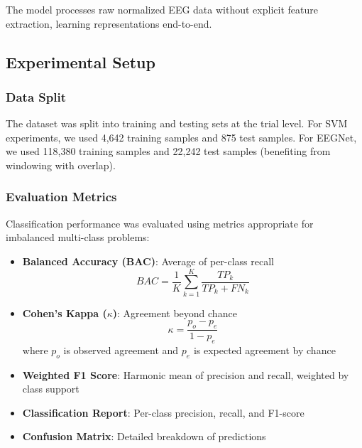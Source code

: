 \documentclass[conference]{IEEEtran}
\begin{document}
The model processes raw normalized EEG data without explicit feature extraction, learning representations end-to-end.

\subsection{Experimental Setup}

\subsubsection{Data Split}
The dataset was split into training and testing sets at the trial level. For SVM experiments, we used 4,642 training samples and 875 test samples. For EEGNet, we used 118,380 training samples and 22,242 test samples (benefiting from windowing with overlap).

\subsubsection{Evaluation Metrics}
Classification performance was evaluated using metrics appropriate for imbalanced multi-class problems:

\begin{itemize}
    \item \textbf{Balanced Accuracy (BAC)}: Average of per-class recall
    \begin{equation}
    BAC = \frac{1}{K}\sum_{k=1}^{K} \frac{TP_k}{TP_k + FN_k}
    \end{equation}
    
    \item \textbf{Cohen's Kappa ($\kappa$)}: Agreement beyond chance
    \begin{equation}
    \kappa = \frac{p_o - p_e}{1 - p_e}
    \end{equation}
    where $p_o$ is observed agreement and $p_e$ is expected agreement by chance
    
    \item \textbf{Weighted F1 Score}: Harmonic mean of precision and recall, weighted by class support
    
    \item \textbf{Classification Report}: Per-class precision, recall, and F1-score
    
    \item \textbf{Confusion Matrix}: Detailed breakdown of predictions
\end{itemize}
\end{document}
